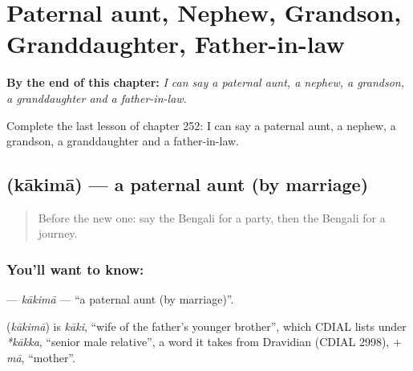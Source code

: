 
\chapter{Paternal aunt, Nephew, Grandson, Granddaughter, Father-in-law}
\label{ch:bn-paternal-aunt-nephew-grandson-granddaughter-father-in-law}

\begin{chapteropening}
\textbf{By the end of this chapter:} \emph{I can say a paternal aunt, a nephew, a grandson, a granddaughter and a father-in-law.}

Complete the last lesson of chapter 252: I can say a paternal aunt, a nephew, a grandson, a granddaughter and a father-in-law.
\end{chapteropening}

\section[\texorpdfstring{\bn{কাকিমা} (kākimā)}{কাকিমা (kākimā)}]{ (kākimā) — a paternal aunt (by marriage)}

\label{lesson:BN-C252-kakima}



\begin{quote}
Before the new one: say the Bengali for a party, then the Bengali for a journey.
\end{quote}

\subsection*{You'll want to know: }
\textbf{} — \emph{kākimā} — \textquotedblleft{}a paternal aunt (by marriage)\textquotedblright{}.

\begin{cousinweb}
\textbf{} (\emph{kākimā}) is \emph{kāki}, \textquotedblleft{}wife of the father's younger brother\textquotedblright{}, which CDIAL lists under \emph{*kākka}, \textquotedblleft{}senior male relative\textquotedblright{}, a word it takes from Dravidian (CDIAL 2998), + \emph{mā}, \textquotedblleft{}mother\textquotedblright{}.
\end{cousinweb}

